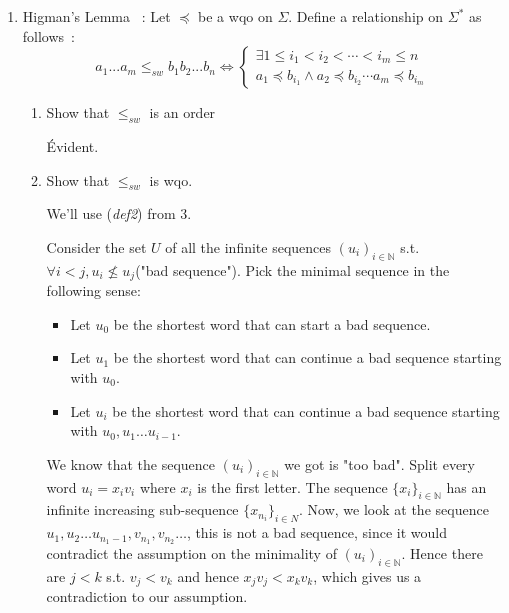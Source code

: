 \documentclass[a4paper,11pt]{exam}
\newcommand{\N}{\mathbb{N}}
\begin{document}
\begin{questions}
\begin{enumerate}
\begin{solution}
			\end{solution}
			
			\item Higman's Lemma ~:
			Let $\preccurlyeq$ be a wqo on $\Sigma$.
			Define a relationship on $\Sigma^*$ as follows~:
			\[
			a_1...a_m \leq_{sw} b_1b_2...b_n \Leftrightarrow \left\{
			\begin{array}{l}
			\exists 1\leq i_1 < i_2 <\cdots < i_m \leq n \\
			a_1\preccurlyeq b_{i_1} \wedge a_2\preccurlyeq b_{i_2} \cdots
			a_m\preccurlyeq b_{i_m}
			\end{array}
			\right.
			\]
			
			\begin{enumerate}
				\item Show that $\leq_{sw}$ is an order %
				
				\begin{solution}
					Évident.
				\end{solution}
				
				\item Show that $\leq_{sw}$ is wqo.
				
				\begin{solution}
					We'll use (\textit{def2}) from 3.
					
					Consider the set $U$ of all the infinite sequences $(u_i)_{i\in\N}$ s.t.
					$\forall i<j, u_i \not\leq u_j$("bad sequence"). Pick the minimal sequence in the following sense: 
					\begin{itemize}
						\item Let $u_0$ be the shortest word that can start a bad sequence.
						\item Let $u_1$ be the shortest word that can continue a bad sequence starting with $u_0$.
						\item Let $u_i$ be the shortest word that can continue a bad sequence starting with $u_0,u_1\ldots u_{i-1}$.
					\end{itemize}
					We know that the sequence $(u_i)_{i\in\N}$ we got is "too bad".  Split every word $u_i=x_iv_i$ where $x_i$ is the first letter. The sequence $\{x_i\}_{i\in \N}$ has an infinite increasing sub-sequence $\{x_{n_i}\}_{i\in N}$. Now, we look at the sequence $u_1,u_2\ldots u_{n_1 -1}, v_{n_1},v_{n_2}\ldots$, this is not a bad sequence, since it would contradict the assumption on the minimality of $(u_i)_{i\in\N}$. Hence there are $j<k$ s.t. $v_j<v_k$ and hence $ x_j v_j<x_k v_k$, which gives us a contradiction to our assumption.
					

\end{solution}
\end{enumerate}
\end{enumerate}
\end{questions}
\end{document}

